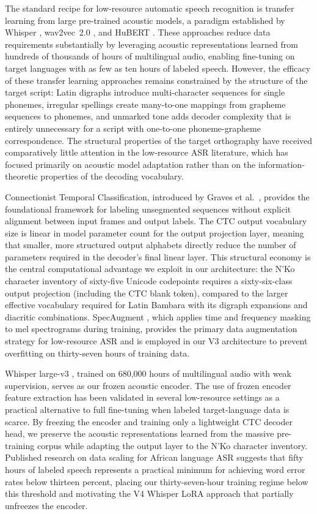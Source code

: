 \documentclass[11pt]{article}
\newcommand{\nko}{N'Ko}
\begin{document}
The standard recipe for low-resource automatic speech recognition is transfer learning from large pre-trained acoustic models, a paradigm established by Whisper \cite{radford2023robust}, wav2vec~2.0 \cite{baevski2020wav2vec}, and HuBERT \cite{hsu2021hubert}. These approaches reduce data requirements substantially by leveraging acoustic representations learned from hundreds of thousands of hours of multilingual audio, enabling fine-tuning on target languages with as few as ten hours of labeled speech. However, the efficacy of these transfer learning approaches remains constrained by the structure of the target script: Latin digraphs introduce multi-character sequences for single phonemes, irregular spellings create many-to-one mappings from grapheme sequences to phonemes, and unmarked tone adds decoder complexity that is entirely unnecessary for a script with one-to-one phoneme-grapheme correspondence. The structural properties of the target orthography have received comparatively little attention in the low-resource ASR literature, which has focused primarily on acoustic model adaptation rather than on the information-theoretic properties of the decoding vocabulary.

Connectionist Temporal Classification, introduced by Graves et al.\ \cite{graves2006connectionist}, provides the foundational framework for labeling unsegmented sequences without explicit alignment between input frames and output labels. The CTC output vocabulary size is linear in model parameter count for the output projection layer, meaning that smaller, more structured output alphabets directly reduce the number of parameters required in the decoder's final linear layer. This structural economy is the central computational advantage we exploit in our architecture: the \nko{} character inventory of sixty-five Unicode codepoints requires a sixty-six-class output projection (including the CTC blank token), compared to the larger effective vocabulary required for Latin Bambara with its digraph expansions and diacritic combinations. SpecAugment \cite{park2019specaugment}, which applies time and frequency masking to mel spectrograms during training, provides the primary data augmentation strategy for low-resource ASR and is employed in our V3 architecture to prevent overfitting on thirty-seven hours of training data.

Whisper large-v3 \cite{radford2023robust}, trained on 680,000 hours of multilingual audio with weak supervision, serves as our frozen acoustic encoder. The use of frozen encoder feature extraction has been validated in several low-resource settings as a practical alternative to full fine-tuning when labeled target-language data is scarce. By freezing the encoder and training only a lightweight CTC decoder head, we preserve the acoustic representations learned from the massive pre-training corpus while adapting the output layer to the \nko{} character inventory. Published research on data scaling for African language ASR \cite{data_scaling_2024} suggests that fifty hours of labeled speech represents a practical minimum for achieving word error rates below thirteen percent, placing our thirty-seven-hour training regime below this threshold and motivating the V4 Whisper LoRA approach that partially unfreezes the encoder.
\end{document}
